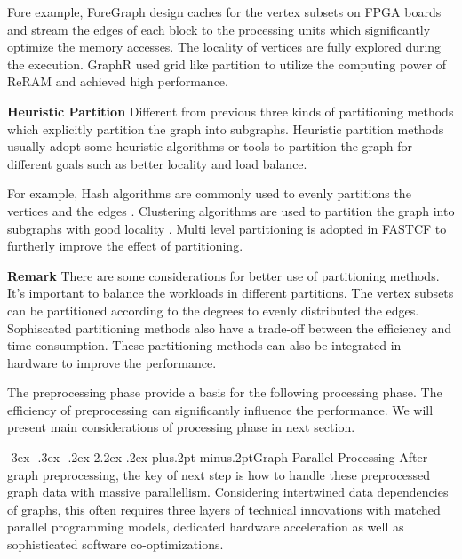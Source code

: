 \documentclass[twoside]{article}
\makeatletter
\def\section{\@startsection{section}{1}{\z@}%
 {-3ex \@plus -.3ex \@minus -.2ex}%
 {2.2ex \@plus.2ex}%
{\normalfont\normalsize\protect\baselineskip=14.5pt plus.2pt minus.2pt\bfseries}}
\makeatother
\begin{document}
\begin{multicols}{2}
Fore example, ForeGraph \cite{Dai2017foregraph} design caches for the vertex subsets on FPGA boards and stream the edges of each block to the processing units which significantly optimize the memory accesses. The locality of vertices are fully explored during the execution. GraphR \cite{song2018graphr} used grid like partition to utilize the computing power of ReRAM and achieved high performance. 

{\bf Heuristic Partition}\quad
Different from previous three kinds of partitioning methods which explicitly partition the graph into subgraphs. Heuristic partition methods usually adopt some heuristic algorithms or tools to partition the graph for different goals such as better locality and load balance. 

For example, Hash algorithms are commonly used to evenly partitions the vertices and the edges \cite{ozdal2016energy}. Clustering algorithms are used to partition the graph into subgraphs with good locality \cite{Khoram2018fpgaco-optimizinghmc}. Multi level partitioning is adopted in FASTCF \cite{Zhou2018fastcf} to furtherly improve the effect of partitioning.

{\bf Remark}
There are some considerations for better use of partitioning methods. It's important to balance the workloads in different partitions. The vertex subsets can be partitioned according to the degrees to evenly distributed the edges. Sophiscated partitioning methods also have a trade-off between the efficiency and time consumption. These partitioning methods can also be integrated in hardware to improve the performance.

The preprocessing phase provide a basis for the following processing phase. The efficiency of preprocessing can significantly influence the performance. We will present main considerations of processing phase in next section.

\section{Graph Parallel Processing}
After graph preprocessing, the key of next step is how to handle these preprocessed graph data with massive parallellism. Considering intertwined data dependencies of graphs, this often requires three layers of technical innovations with matched parallel programming models, dedicated hardware acceleration as well as sophisticated software co-optimizations.%


\end{multicols}
\end{document}
